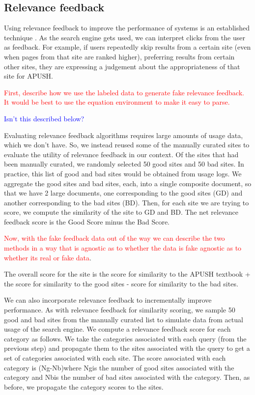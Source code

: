 \documentclass[pdfpagelabels=false,plainpages=true]{acm_proc_article-sp}
\begin{document}
\subsection{Relevance feedback}

Using relevance feedback to improve the performance of systems is an established
technique \cite{salton1997improving}. As the search engine gets used, we can
interpret clicks from the user as feedback. For example, if users repeatedly
skip results from a certain site (even when pages from that site are ranked
higher), preferring results from certain other sites, they are expressing a
judgement about the appropriateness of that site for APUSH. 

\textcolor{red}{First, describe how we use the labeled data to generate fake
  relevance feedback. It would be best to use the equation environment to make
  it easy to parse. }

\textcolor{blue}{Isn't this described below?}

Evaluating relevance feedback algorithms requires large amounts of usage
data, which we don't have. So, we instead reused some of the manually curated
sites to evaluate the utility of relevance feedback in our context. Of the sites
that had been manually curated, we randomly selected 50 good sites and 50 bad
sites. In practice, this list of good and bad sites would be obtained from usage
logs. We aggregate the good sites and bad sites, each, into a single composite
document, so that we have 2 large documents, one corresponding to the good sites
(GD) and another corresponding to the bad sites (BD). Then, for each site we are
trying to score, we compute the similarity of the site to GD and BD. The net
relevance feedback score is the Good Score minus the Bad Score. 

\textcolor{red}{Now, with the fake feedback data out of the way we can describe
  the two methods in a way that is agnostic as to whether the data is fake
  agnostic as to whether its real or fake data}. 

The overall score for the site is the score for similarity to the APUSH textbook + the score
for similarity to the good sites - score for similarity to the bad sites. 

We can also incorporate relevance feedback to incrementally improve
performance. As with relevance feedback for similarity scoring, we sample 50
good and bad sites from the manually curated list to simulate data from actual
usage of the search engine. We compute a relevance feedback score for each
category as follows. We take the categories associated with each query (from the
previous step) and propagate them to the sites associated with the query to get
a set of categories associated with each site. The score associated with each
category is (Ng-Nb)where Ngis the number of good sites associated with the
category and Nbis the number of bad sites associated with the category. Then, as
before, we propagate the category scores to the sites.  
\end{document}

